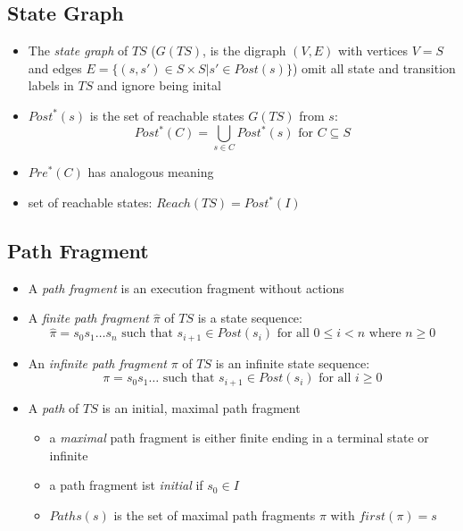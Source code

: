\documentclass[a4paper, 10pt]{article}
\begin{document}
\subsection*{State Graph}
\begin{shaded}
\begin{itemize}
    \item The \emph{state graph} of $TS$ ($G(TS)$, is the digraph $(V,E)$ with vertices $V=S$ and edges $E=\{(s,s')\in S\times S | s'\in Post(s)\}$) \follows \; omit all state and transition labels in $TS$ and ignore being inital
    \item $Post^*(s)$ is the set of reachable states $G(TS)$ from $s$:
    \[ Post^*(C)=\bigcup_{s\in C}Post^*(s) \textrm{ for } C \subseteq S \]
    \item $Pre^*(C)$ has analogous meaning
    \item set of reachable states: $Reach(TS)=Post^*(I)$
\end{itemize}
\end{shaded}

\subsection*{Path Fragment}
\begin{shaded}
    \begin{itemize}
        \item A \emph{path fragment} is an execution fragment without actions
        \item A \emph{finite path fragment} $\hat{\pi}$ of $TS$ is a state sequence:
        \[ \hat{\pi} = s_0s_1\dots s_n \textrm{ such that } s_{i+1}\in Post(s_i) \textrm{ for all } 0 \leq i<n \textrm{ where } n\geq0 \]
        \item An \emph{infinite path fragment} $\pi$ of $TS$ is an infinite state sequence:
        \[ \pi=s_0s_1\dots \textrm{ such that } s_{i+1}\in Post(s_i) \textrm{ for all } i\geq0 \]
        \item A \emph{path} of $TS$ is an initial, maximal path fragment
        \begin{itemize}
            \item a \emph{maximal} path fragment is either finite ending in a terminal state or infinite
            \item a path fragment ist \emph{initial} if $s_0\in I$
            \item $Paths(s)$ is the set of maximal path fragments $\pi$ with $first(\pi)=s$
        \end{itemize}
    \end{itemize}
\end{shaded}
\begin{center}
\scalebox{1}{}
\end{center}
\end{document}
